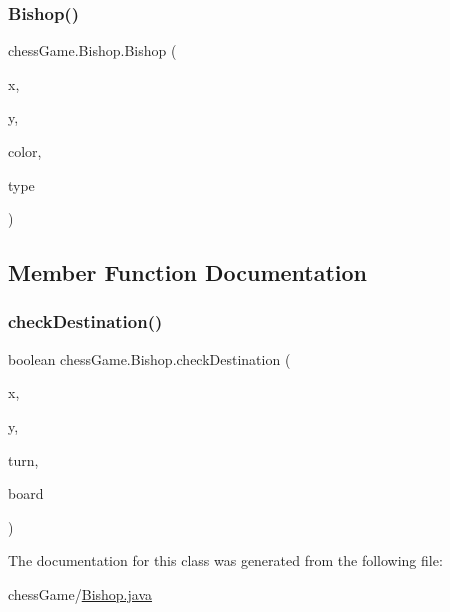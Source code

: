 \subsubsection{\texorpdfstring{Bishop()}{Bishop()}}
{\footnotesize\ttfamily chess\+Game.\+Bishop.\+Bishop (\begin{DoxyParamCaption}\item[{int}]{x,  }\item[{int}]{y,  }\item[{\hyperlink{classchess_game_1_1_piece_ad5117cbbbaebf3a27c4f3c2bcbd6678b}{color}}]{color,  }\item[{\hyperlink{classchess_game_1_1_piece_a1370c7f61581a1b72fa8ac2fd1af70a2}{type}}]{type }\end{DoxyParamCaption})}



\subsection{Member Function Documentation}
\hypertarget{classchess_game_1_1_bishop_a93e6dd0e281ab29a95768a09424a297c}{}\label{classchess_game_1_1_bishop_a93e6dd0e281ab29a95768a09424a297c} 
\subsubsection{\texorpdfstring{check\+Destination()}{checkDestination()}}
{\footnotesize\ttfamily boolean chess\+Game.\+Bishop.\+check\+Destination (\begin{DoxyParamCaption}\item[{int}]{x,  }\item[{int}]{y,  }\item[{int}]{turn,  }\item[{\hyperlink{classchess_game_1_1_chess_board}{Chess\+Board}}]{board }\end{DoxyParamCaption})}



The documentation for this class was generated from the following file\+:\begin{DoxyCompactItemize}
\item 
chess\+Game/\hyperlink{_bishop_8java}{Bishop.\+java}\end{DoxyCompactItemize}
